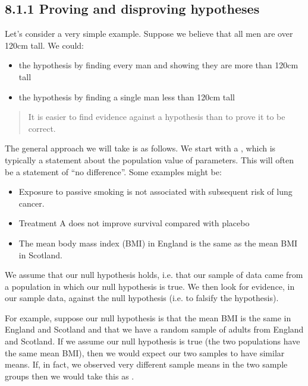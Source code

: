 \documentclass[letterpaper,10pt,english]{jupyterBook}
\begin{document}
\subsection{8.1.1 Proving and disproving hypotheses}
\label{\detokenize{08.b. Frequentist II:proving-and-disproving-hypotheses}}
\sphinxAtStartPar
Let’s consider a very simple example. Suppose we believe that all men are over 120cm tall. We could:
\begin{itemize}
\item {} 
\sphinxAtStartPar
{} the hypothesis by finding every man and showing they are more than 120cm tall

\item {} 
\sphinxAtStartPar
{} the hypothesis by finding a single man less than 120cm tall

\end{itemize}
\begin{quote}

\sphinxAtStartPar
It is easier to find evidence against a hypothesis than to prove it to be correct.
\end{quote}

\sphinxAtStartPar
The general approach we will take is as follows. We start with a , which is typically a statement about the population value of parameters. This will often be a statement of “no difference”. Some examples might be:
\begin{itemize}
\item {} 
\sphinxAtStartPar
Exposure to passive smoking is not associated with subsequent risk of lung cancer.

\item {} 
\sphinxAtStartPar
Treatment A does not improve survival compared with placebo

\item {} 
\sphinxAtStartPar
The mean body mass index (BMI) in England is the same as the mean BMI in Scotland.

\end{itemize}

\sphinxAtStartPar
We assume that our null hypothesis holds, i.e. that our sample of data came from a population in which our null hypothesis is true. We then look for evidence, in our sample data, against the null hypothesis (i.e. to falsify the hypothesis).

\sphinxAtStartPar
For example, suppose our null hypothesis is that the mean BMI is the same in England and Scotland and that we have a random sample of adults from England and Scotland. If we assume our null hypothesis is true (the two populations have the same mean BMI), then we would expect our two samples to have similar means. If, in fact, we observed very different sample means in the two sample groups then we would take this as .
\end{document}

